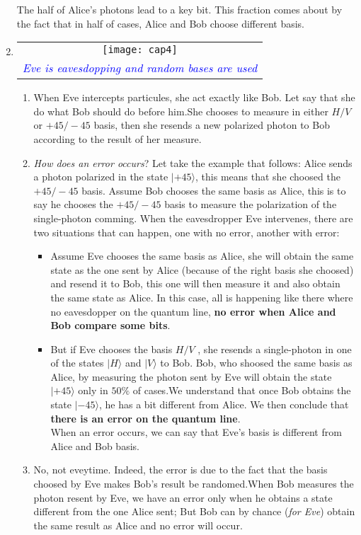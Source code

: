 \documentclass[a4paper,12pt]{article}
\newcommand{\pqc}{|+45\rangle}
\newcommand{\mqc}{|-45\rangle}
\newcommand{\kH}{|H\rangle}
\newcommand{\kV}{|V\rangle}
\newcommand{\tbl}[1]{\textcolor{blue}{#1}}
\newcommand{\bfs}[1]{\textbf{#1}}
\begin{document}
\begin{enumerate}
The half of Alice's photons lead to a key bit. This fraction comes about by the fact that in half of cases, Alice and Bob choose different basis.
\item  \hspace{2cm}\begin{tabular}{c} \texttt{[image: cap4]}\\
	\tbl{\emph{Eve is eavesdopping and random bases are used}} \end{tabular}
\begin{enumerate}
	 \item When Eve intercepts particules, she act exactly like Bob. Let say that she do what Bob should do before him.She chooses to measure in either $H/V$ or $+45/-45$ basis, then she resends a new polarized photon to Bob according to the result of her measure.
	\item \emph{How does an error occurs}? Let take the example that follows:
	Alice sends a photon polarized in the state $\pqc$, this means that she choosed the $+45/-45$ basis. Assume Bob chooses the same basis as Alice, this is to say he chooses the $+45/-45$ basis to measure the polarization of the single-photon comming. When the eavesdropper Eve intervenes, there are two situations that can happen, one with no error, another with error:
	\begin{itemize}[label=$\therefore$, font=\color{blue} ]
		\item Assume Eve chooses the same basis as Alice, she will obtain the same state as the one sent by Alice (because of the right basis she choosed) and resend it to Bob, this one will then measure it and also obtain the same state as Alice. In this case, all is happening like there where no eavesdopper on the quantum line, \bfs{no error when Alice and Bob compare some bits}.
		\item But if Eve chooses the basis $H/V$ , she resends a single-photon in one of the states $\kH$ and $\kV$ to Bob. Bob, who shoosed the same basis as Alice, by measuring the photon sent by Eve will obtain the state $\pqc$ only in $50\%$ of cases.We understand that once Bob obtains the state $\mqc$, he has a bit different from Alice. We then conclude that \bfs{there is an error on the quantum line}.\\
		When an error occurs, we can say that Eve's basis is different from Alice and Bob basis.
	\end{itemize}
		\item No, not eveytime. Indeed, the error is due to the fact that the basis choosed by Eve makes Bob's result be randomed.When Bob measures the photon resent by Eve, we have an error only when he obtains a state different from the one Alice sent; But Bob can by chance (\textit{for Eve}) obtain the same result as Alice and no error will occur.

\end{enumerate}
\end{enumerate}
\end{document}

